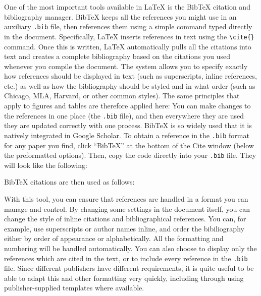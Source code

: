 One of the most important tools available in {\LaTeX}
is the BibTeX citation and bibliography manager.\cite{kopka1995guide}
BibTeX keeps all the references you might use in an auxiliary \texttt{.bib} file,
then references them using a simple command typed directly in the document.
Specifically, {\LaTeX} inserts references in text using the \texttt{\textbackslash cite\{\}} command.
Once this is written, {\LaTeX} automatically pulls all the citations into text
and creates a complete bibliography based on the citations you used whenever you compile the document.
The system allows you to specify exactly how references should be displayed in text
(such as superscripts, inline references, etc.)
as well as how the bibliography should be styled and in what order
(such as Chicago, MLA, Harvard, or other common styles).
The same principles that apply to figures and tables are therefore applied here:
You can make changes to the references in one place (the \texttt{.bib} file),
and then everywhere they are used they are updated correctly with one process.
BibTeX is so widely used that it is natively integrated in Google Scholar.
To obtain a reference in the \texttt{.bib} format for any paper you find,
click ``BibTeX'' at the bottom of the Cite window (below the preformatted options).
Then, copy the code directly into your \texttt{.bib} file.
They will look like the following:


\noindent BibTeX citations are then used as follows:


With this tool, you can ensure that references are handled
in a format you can manage and control.\cite{flom2005latex}
By changing some settings in the document itself,
you can change the style of inline citations and bibliographical references.
You can, for example, use superscripts or author names inline,
and order the bibiliography either by order of appearance or alphabetically.
All the formatting and numbering will be handled automatically.
You can also choose to display only the references which are cited in the text,
or to include every reference in the \texttt{.bib} file.
Since different publishers have different requirements,
it is quite useful to be able to adapt this and other formatting very quickly,
including through using publisher-supplied templates where available.

